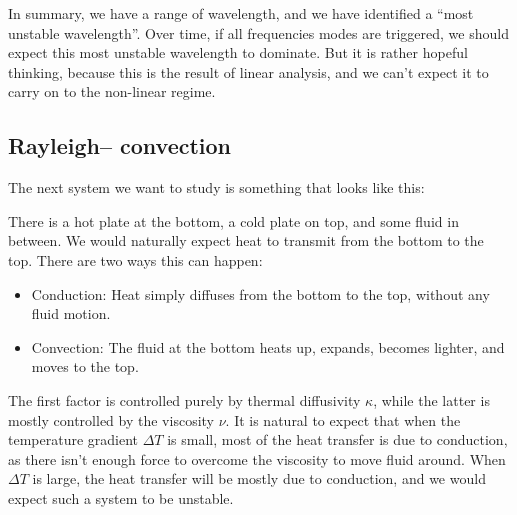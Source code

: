 \documentclass[a4paper]{article}
\begin{document}
In summary, we have a range of wavelength, and we have identified a ``most unstable wavelength''. Over time, if all frequencies modes are triggered, we should expect this most unstable wavelength to dominate. But it is rather hopeful thinking, because this is the result of linear analysis, and we can't expect it to carry on to the non-linear regime.

\subsection{Rayleigh-- convection}
The next system we want to study is something that looks like this:
\begin{center}
\end{center}
There is a hot plate at the bottom, a cold plate on top, and some fluid in between. We would naturally expect heat to transmit from the bottom to the top. There are two ways this can happen:
\begin{itemize}
  \item Conduction: Heat simply diffuses from the bottom to the top, without any fluid motion.
  \item Convection: The fluid at the bottom heats up, expands, becomes lighter, and moves to the top.
\end{itemize}
The first factor is controlled purely by thermal diffusivity $\kappa$, while the latter is mostly controlled by the viscosity $\nu$. It is natural to expect that when the temperature gradient $\Delta T$ is small, most of the heat transfer is due to conduction, as there isn't enough force to overcome the viscosity to move fluid around. When $\Delta T$ is large, the heat transfer will be mostly due to conduction, and we would expect such a system to be unstable.
\end{document}
